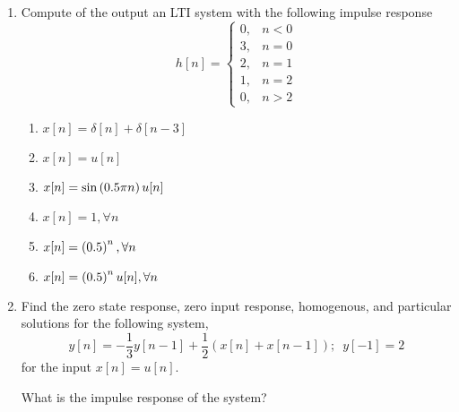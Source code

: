 \documentclass[12pt]{article}
\def\lp{\ensuremath\left(}
\def\rp{\ensuremath\right)}
\begin{document}
\begin{enumerate}
    \item Compute of the output an LTI system with the following impulse response
    \[ h[n] = \begin{cases} 0, & n < 0 \\ 3, & n = 0 \\ 2, & n = 1 \\ 1, & n = 2 \\ 0, & n > 2\end{cases}\] 
    \begin{enumerate}
        \item $x[n] = \delta[n] + \delta[n - 3]$ \newpage
        \item $x[n] = u[n]$ \newpage
        \item $x[n] = \sin\lp 0.5\pi n\rp u[n]$ \newpage
        \item $x[n] = 1, \forall n$ \newpage
        \item $x[n] = \lp 0.5 \rp^n, \forall n$ \newpage
        \item $x[n] = \lp 0.5 \rp^nu[n], \forall n$ \newpage
    \end{enumerate}

    \item Find the zero state response, zero input response, homogenous, and particular solutions for the following system,
    \[ y[n] = -\frac{1}{3} y[n - 1] + \frac{1}{2} \left(x[n] + x[n-1] \right); \,\,\, y[-1] = 2 \]
    for the input $x[n] = u[n]$.

    What is the impulse response of the system?
\end{enumerate}
\end{document}
